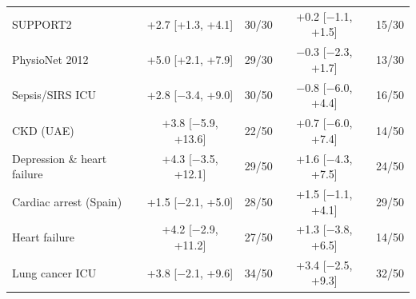 \begin{table}[!htb]
{\begin{tabular}{lcccc}
SUPPORT2 & +2.7 [+1.3, +4.1] & 30/30 & +0.2 [$-$1.1, +1.5] & 15/30 \\
PhysioNet 2012 & +5.0 [+2.1, +7.9] & 29/30 & $-$0.3 [$-$2.3, +1.7] & 13/30 \\
Sepsis/SIRS ICU & +2.8 [$-$3.4, +9.0] & 30/50 & $-$0.8 [$-$6.0, +4.4] & 16/50 \\
CKD (UAE) & +3.8 [$-$5.9, +13.6] & 22/50 & +0.7 [$-$6.0, +7.4] & 14/50 \\
Depression \& heart failure & +4.3 [$-$3.5, +12.1] & 29/50 & +1.6 [$-$4.3, +7.5] & 24/50 \\
Cardiac arrest (Spain) & +1.5 [$-$2.1, +5.0] & 28/50 & +1.5 [$-$1.1, +4.1] & 29/50 \\
Heart failure & +4.2 [$-$2.9, +11.2] & 27/50 & +1.3 [$-$3.8, +6.5] & 14/50 \\
Lung cancer ICU & +3.8 [$-$2.1, +9.6] & 34/50 & +3.4 [$-$2.5, +9.3] & 32/50 \\
\bottomrule
\end{tabular}
}
\end{table}
